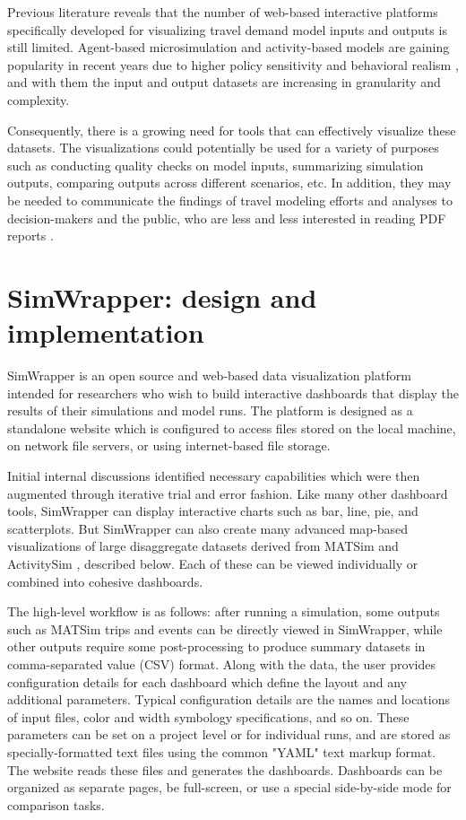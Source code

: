 \documentclass[3p,times,procedia]{elsarticle}
\begin{document}
Previous literature reveals that the number of web-based interactive platforms specifically developed for visualizing travel demand model inputs and outputs is still limited. Agent-based microsimulation and activity-based models are gaining popularity in recent years due to higher policy sensitivity and behavioral realism \cite{LempMcWethy2007}, and with them the input and output datasets are increasing in granularity and complexity.

Consequently, there is a growing need for tools that can effectively visualize these datasets. The visualizations could potentially be used for a variety of purposes such as conducting quality checks on model inputs, summarizing simulation outputs, comparing outputs across different scenarios, etc. In addition, they may be needed to communicate the findings of travel modeling efforts and analyses to decision-makers and the public, who are less and less interested in reading PDF reports \cite{KAHILATANI201945}.

\section{SimWrapper: design and implementation}

SimWrapper is an open source and web-based data visualization platform intended for researchers who wish to build interactive dashboards that display the results of their simulations and model runs. The platform is designed as a standalone website which is configured to access files stored on the local machine, on network file servers, or using internet-based file storage.

Initial internal discussions identified necessary capabilities which were then augmented through iterative trial and error fashion. Like many other dashboard tools, SimWrapper can display interactive charts such as bar, line, pie, and scatterplots. But SimWrapper can also create many advanced map-based visualizations of large disaggregate datasets derived from MATSim and ActivitySim \cite{ActivitySim}, described below. Each of these can be viewed individually or combined into cohesive dashboards.

The high-level workflow is as follows: after running a simulation, some outputs such as MATSim trips and events can be directly viewed in SimWrapper, while other outputs require some post-processing to produce summary datasets in comma-separated value (CSV) format. Along with the data, the user provides configuration details for each dashboard which define the layout and any additional parameters. Typical configuration details are the names and locations of input files, color and width symbology specifications, and so on. These parameters can be set on a project level or for individual runs, and are stored as specially-formatted text files using the common "YAML" text markup format. The website reads these files and generates the dashboards. Dashboards can be organized as separate pages, be full-screen, or use a special side-by-side mode for comparison tasks.
\end{document}

